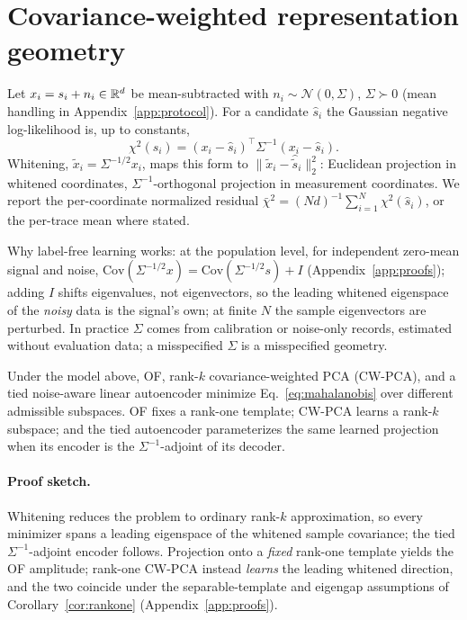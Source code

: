 \section{Covariance-weighted representation geometry}

Let $x_i=s_i+n_i\in\mathbb{R}^d$ be mean-subtracted with $n_i\sim\mathcal{N}(0,\Sigma)$, $\Sigma\succ0$ (mean handling in Appendix~\ref{app:protocol}). For a candidate $\hat{s}_i$ the Gaussian negative log-likelihood is, up to constants,
\begin{equation}
  \chi^2(\hat{s}_i)=(x_i-\hat{s}_i)^\top\Sigma^{-1}(x_i-\hat{s}_i).
  \label{eq:mahalanobis}
\end{equation}
Whitening, $\tilde{x}_i=\Sigma^{-1/2}x_i$, maps this form to $\|\tilde{x}_i-\hat{\tilde{s}}_i\|_2^2$: Euclidean projection in whitened coordinates, $\Sigma^{-1}$-orthogonal projection in measurement coordinates. We report the per-coordinate normalized residual $\bar\chi^2=(Nd)^{-1}\sum_{i=1}^{N}\chi^2(\hat{s}_i)$, or the per-trace mean where stated.

Why label-free learning works: at the population level, for independent zero-mean signal and noise, $\mathrm{Cov}(\Sigma^{-1/2}x)=\mathrm{Cov}(\Sigma^{-1/2}s)+I$ (Appendix~\ref{app:proofs}); adding $I$ shifts eigenvalues, not eigenvectors, so the leading whitened eigenspace of the \emph{noisy} data is the signal's own; at finite $N$ the sample eigenvectors are perturbed. In practice $\Sigma$ comes from calibration or noise-only records, estimated without evaluation data; a misspecified $\Sigma$ is a misspecified geometry.

\begin{proposition}
\label{prop:bridge}
Under the model above, OF, rank-$k$ covariance-weighted PCA (CW-PCA), and a tied noise-aware linear autoencoder minimize Eq.~\eqref{eq:mahalanobis} over different admissible subspaces. OF fixes a rank-one template; CW-PCA learns a rank-$k$ subspace; and the tied autoencoder parameterizes the same learned projection when its encoder is the $\Sigma^{-1}$-adjoint of its decoder.
\end{proposition}

\paragraph{Proof sketch.}
Whitening reduces the problem to ordinary rank-$k$ approximation, so every minimizer spans a leading eigenspace of the whitened sample covariance; the tied $\Sigma^{-1}$-adjoint encoder follows. Projection onto a \emph{fixed} rank-one template yields the OF amplitude; rank-one CW-PCA instead \emph{learns} the leading whitened direction, and the two coincide under the separable-template and eigengap assumptions of Corollary~\ref{cor:rankone} (Appendix~\ref{app:proofs}).

